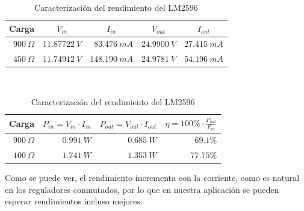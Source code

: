 \begin{table}[H]
    \centering
    \begin{subtable}[t]{\textwidth}
        \centering
        \begin{tabular}{rrrrr}
            \toprule
            \multicolumn{1}{c}{Carga} & \multicolumn{1}{c}{$V_{in}$} & \multicolumn{1}{c}{$I_{in}$} & \multicolumn{1}{c}{$V_{out}$} & \multicolumn{1}{c}{$I_{out}$}\\ \midrule
            $900\ \Omega$             & $11.87722\ V$                 & $83.476\ mA$                 & $24.9900\ V$                  & $27.415\ mA$                \\
            $450\ \Omega$             & $11.74912\ V$                 & $148.190\ mA$                & $24.9781\ V$                  & $54.196\ mA$                \\ \bottomrule
        \end{tabular}
        \caption{Medidas tomadas en laboratorio}
    \end{subtable}
    \\[0.5cm]
    \begin{subtable}[t]{\textwidth}
        \centering
        \begin{tabular}{rrrr}
            \toprule
            \multicolumn{1}{c}{Carga} & \multicolumn{1}{l}{$P_{in} = V_{in}\cdot I_{in}$} & \multicolumn{1}{l}{$P_{out} = V_{out}\cdot I_{out}$} & \multicolumn{1}{l}{$\eta = 100\%\cdot\frac{P_{out}}{P_{in}}$} \\ \midrule
            $900\ \Omega$             & $0.991\ W$                                     & $0.685\ W$                                        & $69.1\%$                                                    \\
            $100\ \Omega$             & $1.741\ W$                                    & $1.353\ W$                                       & $77.75\%$                                                    \\ \bottomrule
        \end{tabular}
        \caption{Cálculos de rendimiento realizados}
    \end{subtable}
    \caption{Caracterización del rendimiento del LM2596}
    \label{tab:rendimiento_reductor}
\end{table}

Como se puede ver, el rendimiento incrementa con la corriente, como es natural en los reguladores conmutados, por lo que en nuestra aplicación se pueden esperar rendimientos incluso mejores.